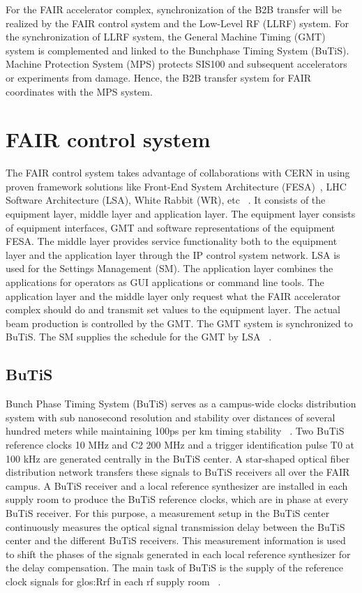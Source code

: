 
For the FAIR accelerator complex, synchronization of the B2B transfer will be realized by the FAIR control system and the Low-Level RF (LLRF) system. For the synchronization of LLRF system, the General Machine Timing (\gls{GMT}) system is complemented and linked to the Bunchphase Timing System (BuTiS). Machine Protection System (MPS) protects SIS100 and subsequent accelerators or experiments from damage. Hence, the B2B transfer system for FAIR coordinates with the MPS system. 
\section{FAIR control system}
The \gls{FAIR} control system takes advantage of collaborations with CERN in using proven framework solutions like Front-End System Architecture (\gls{FESA})~\cite{hoffmann_fesafront-end_2008}, LHC Software Architecture (\gls{LSA}), White Rabbit (\gls{WR}), etc ~\cite{huhmann_fair_2013}. It consists of the equipment layer, middle layer and application layer. The equipment layer consists of equipment interfaces, GMT and software representations of the equipment FESA. The middle layer provides service functionality both to the equipment layer and the application layer through the IP control system network. LSA is used for the Settings Management (SM). The application layer combines the applications for operators as \gls{GUI} applications or command line tools. The application layer and the middle layer only request what the FAIR accelerator complex should do and transmit set values to the equipment layer. The actual beam production is controlled by the GMT. The GMT system is synchronized to BuTiS. The \gls{SM} supplies the schedule for the GMT by LSA ~\cite{huhmann_fair_2013, beck_new_2012}.

\subsection{BuTiS}
Bunch Phase Timing System (BuTiS) serves as a campus-wide clocks distribution system with sub nanosecond resolution and stability over distances of several hundred meters while maintaining 100ps per km timing stability ~\cite{moritz_butisdevelopment_2006}. Two BuTiS reference clocks 10 MHz and C2 200 MHz and a trigger identification pulse T0 at 100 kHz are generated centrally in the BuTiS center. A star-shaped optical fiber distribution network transfers these signals to BuTiS receivers all over the FAIR campus. A BuTiS receiver and a local reference synthesizer are installed in each supply room to produce the BuTiS reference clocks, which are in phase at every BuTiS receiver. For this purpose, a measurement setup in the BuTiS center continuously measures the optical signal transmission delay between the BuTiS center and the different BuTiS receivers. This measurement information is used to shift the phases of the signals generated in each local reference synthesizer for the delay compensation. The main task of BuTiS is the supply of the reference clock signals for \gls{glos:Rrf} in each rf supply room ~\cite{moritz_butisdevelopment_2006, zipfel_recent_2011}.

